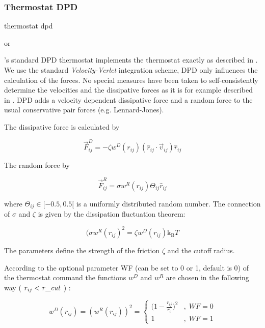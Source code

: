 \subsubsection{Thermostat DPD}

\begin{essyntax}
  thermostat dpd    
  \begin{features}
     or 
  \end{features}
\end{essyntax}

\es's standard DPD thermostat implements the thermostat exactly as
described in \cite{soddeman03a}.  We use the standard
\textit{Velocity-Verlet} integration scheme, \eg DPD only influences
the calculation of the forces. No special measures have been taken to
self-consistently determine the velocities and the dissipative forces
as it is for example described in \cite{Nikunen03}.  DPD adds a
velocity dependent dissipative force and a random force to the usual
conservative pair forces (e.g. Lennard-Jones).

The dissipative force is calculated by

$$ \vec{F}_{ij}^{D} = -\zeta w^D (r_{ij}) (\hat{r}_{ij} \cdot \vec{v}_{ij}) \hat{r}_{ij} $$

The random force by

$$ \vec{F}_{ij}^R = \sigma w^R (r_{ij}) \Theta_{ij} \hat{r}_{ij} $$

where $ \Theta_{ij} \in [ -0.5 , 0.5 [ $ is a uniformly distributed random number.
The connection of $\sigma $ and $\zeta $ is given by the dissipation fluctuation theorem:
 
$$ (\sigma w^R (r_{ij})^2=\zeta w^D (r_{ij}) \text{k}_\text{B} T $$

The parameters   define the strength of the
friction $\zeta$ and the cutoff radius.

According to the optional parameter WF (can be set to 0 or 1, default
is 0) of the thermostat command the functions $w^D$ and $w^R$ are
chosen in the following way ( $ r_{ij} < \mathrm{\mathit{r\_cut}} $ ) :

$$ 
w^D (r_{ij}) = ( w^R (r_{ij})) ^2 = 
   \left\{
   \begin{array}{clcr} 
             {( 1 - \frac{r_{ij}}{r_c}} )^2 & , \; WF = 0 \\
             1                      & , \; WF = 1
   \end{array}
   \right.
$$

